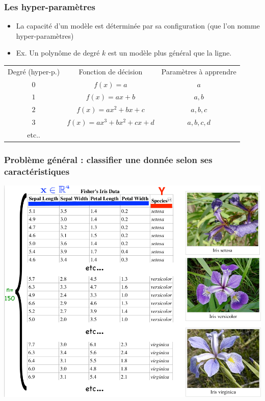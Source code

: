 \documentclass[french]{beamer}
\begin{document}
\begin{frame}
\frametitle{Les hyper-paramètres}

\begin{itemize}
\item La capacité d'un modèle est déterminée par sa configuration (que l'on nomme hyper-paramètres)
\pause
\item Ex. Un polynôme de degré $k$ est un modèle plus général que la ligne.
\end{itemize}

\begin{tabular}{ccc}
Degré (hyper-p.) & Fonction de décision & Paramètres à apprendre \\
$0$	& $f(x) = a$ & $a$ \\
$1$ & $f(x) = ax+b$ & $a,b$ \\
$2$ & $f(x) = ax^2 + bx + c$ & $a,b,c$ \\
$3$ & $f(x) = ax^3 + bx^2 + cx + d$ & $a,b,c,d$ \\
etc..& &
\end{tabular}

\end{frame}



\begin{frame}[fragile]
\frametitle{Problème général : classifier une donnée selon ses
caractéristiques}

\begin{center}
\includegraphics[scale=0.28]{10.png}
\end{center}

\end{frame}
\end{document}
